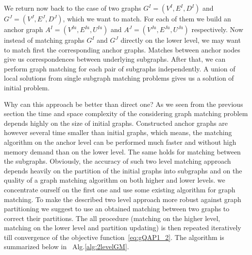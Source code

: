 We return now back to the case of two graphs $G^I=(V^I,E^I,D^I)$ and $G^J=(V^J,E^J,D^J)$, which we want to match. 
For each of them we build an anchor graph $A^I=(V^{Ia},E^{Ia},U^{Ia})$ and $A^J=(V^{Ja},E^{Ja},U^{Ja})$ respectively.
Now instead of matching graphs $G^I$ and $G^J$ directly on the lower level, we may want to match first the corresponding anchor graphs. Matches between anchor nodes give us correspondences between underlying subgraphs. After that, we can perform graph matching for each pair of subgraphs  independently. A union of local solutions from single subgraph matching problems gives us a solution of initial problem. 

Why can this approach be better than direct one? As we seen from the previous section the time and space complexity of the considering graph matching problem depends highly on the size of initial graphs. Constructed anchor graphs are however several time smaller than initial graphs, which means, the matching algorithm on the anchor level can be performed much faster and without high memory demand than on the lower level. The same holds for matching between the subgraphs.
Obviously, the accuracy of such two level matching approach depends heavily on the partition of the initial graphs into subgraphs and on the quality of a graph matching algorithm on both higher and lower levels.  we concentrate ourself on the first one and use some existing algorithm for graph matching. To make the described two level approach more robust against graph partitioning we suggest to use an obtained matching between two graphs to correct their partitions. The all procedure (matching on the higher level, matching on the lower level and partition updating) is then repeated iteratively till convergence of the objective function~\eqref{eq:gQAP1_2}. The algorithm is summarized below in~ Alg.\ref{alg:2levelGM}.

